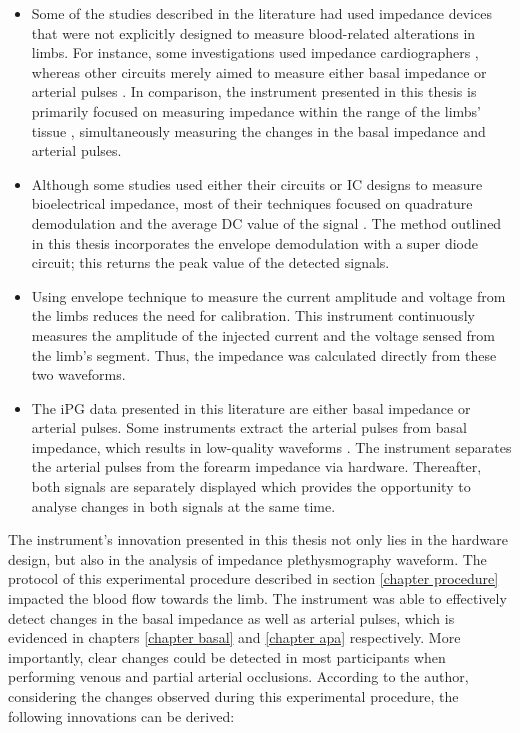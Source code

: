 \begin{itemize}
	\item Some of the studies described in the literature had used impedance devices that were not explicitly designed to measure blood-related alterations in limbs. For instance, some investigations used impedance cardiographers \cite{porter1985measurement, distefano1973bioelectrical, yamamoto1992impedance, couch1971noninvasive}, whereas other  circuits merely aimed to measure either basal impedance \cite{mohapatra1979measurement, yamakoshi1980limb, nyober1950electrical, yamakoshi1978admittance, yamamoto1992impedance} or arterial pulses \cite{mohapatra1979measurement, costeloe1980continuous, corciova2011peripheral, brown1975impedance, yamamoto1992impedance, wang2011development}. In comparison, the instrument presented in this thesis is primarily focused on measuring impedance within the range of the limbs' tissue \cite{gabriel1996dielectric}, simultaneously measuring the changes in the basal impedance and arterial pulses. 
	\item Although some studies used either their circuits or IC designs to measure  bioelectrical impedance, most of their techniques focused on quadrature demodulation and the average DC value of the signal \cite{yufera2002integrated, pallas1993bioelectric, min2000lock}. The method outlined in this thesis incorporates the envelope demodulation with a super diode circuit; this returns the peak value of the detected signals.
	\item Using envelope technique to measure the current amplitude and voltage from the limbs reduces the need for calibration. This instrument continuously measures the amplitude of the injected current and the voltage sensed from the limb's segment. Thus, the impedance was calculated directly from these two waveforms. 
	\item The iPG data presented in this literature are either basal impedance or arterial pulses. Some instruments extract the arterial pulses from  basal impedance, which results in low-quality waveforms \cite{mohapatra1979measurement, yamamoto1992impedance}. The instrument separates the arterial pulses from the forearm impedance via hardware. Thereafter, both signals are separately displayed  which provides the opportunity to analyse changes in both signals at the same time.
\end{itemize} 

The instrument's innovation presented in this thesis not only lies in the hardware design, but also in the analysis of  impedance plethysmography waveform. The protocol of this experimental procedure described in section \ref{chapter procedure} impacted the blood flow towards the limb. The instrument was able to effectively detect changes in the basal impedance as well as arterial pulses, which is evidenced in chapters \ref{chapter basal} and \ref{chapter apa} respectively. More importantly, clear changes could be detected in most participants when performing venous and partial arterial occlusions. According to the author, considering the changes observed during this experimental procedure, the following innovations can be derived:


